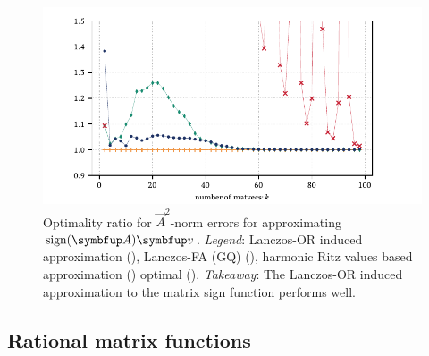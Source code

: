 \begin{figure}[ht]
    \begin{center}
        \includegraphics{imgs/ch6_sign.pdf} 
    \end{center}
    \caption[{Optimality ratio for $\vec{A}^2$-norm errors for approximating $\operatorname{sign}\A\vec{v}$.}]{%
    Optimality ratio for $\vec{A}^2$-norm errors for approximating $\operatorname{sign}\A\vec{v}$.
    \hspace{.25em}\textit{Legend}:
    Lanczos-OR induced approximation
    ({\protect{}}), 
    Lanczos-FA (GQ) ({\protect{}}),
    harmonic Ritz values based approximation
    ({\protect{}})
    optimal
    ({\protect{}}). 
    \hspace{.25em}\textit{Takeaway}: The Lanczos-OR induced approximation to the matrix sign function performs well.
    }
    \label{fig:ch6_sign}
\end{figure}



\subsection{Rational matrix functions}

